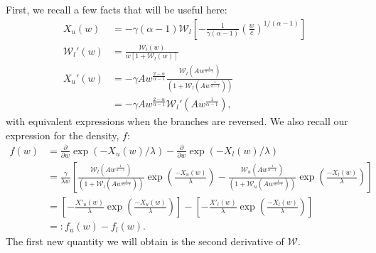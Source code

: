 \documentclass{article}
\newcommand{\sW}{\mathscr{W}}
\begin{document}
First, we recall a few facts that will be useful here:
%
\begin{align}
    X_u(w) &= -\gamma (\alpha - 1) \sW_l\left[ - \frac{1}{\gamma (\alpha - 1)} \left( \frac{w}{c} \right)^{1 / (\alpha - 1)} \right]\\
    \sW_l'(w) &= \frac{\sW_l(w)}{w [1 + \sW_l(w)]} \label{eq:W_prime}\\
    X_u'(w) &= - \gamma A  w^{\frac{2-\alpha}{\alpha-1}} \frac{\sW_l(A w^{ \frac{1}{\alpha-1} })}{ \left( 1 + \sW_l(A w^{ \frac{1}{\alpha-1} }) \right)}\\
    &= - \gamma A  w^{\frac{2-\alpha}{\alpha-1}} \sW_l'(A w^{ \frac{1}{\alpha-1} }), \label{eq:X_u_prime}
\end{align}
%
with equivalent expressions when the branches are reversed. We also recall our expression for the density, $f$:
%
\begin{align}
    f(w) &= \frac{\partial}{\partial w} \exp(-X_u(w)/ \lambda) - \frac{\partial}{\partial w} \exp(-X_l(w)/\lambda) \\
    &= \frac{\gamma}{\lambda w} \left[ \frac{\sW_l(A w^{ \frac{1}{\alpha-1} })}{ \left( 1 + \sW_l(A w^{ \frac{1}{\alpha-1} }) \right)} \exp\left(\frac{-X_{u}(w)}{\lambda}\right) - \frac{\sW_u(A w^{ \frac{1}{\alpha-1} })}{ \left( 1 + \sW_u(A w^{ \frac{1}{\alpha-1} }) \right)}  \exp\left(\frac{-X_{l}(w)}{\lambda}\right) \right]\\
    &= \left[ - \frac{X'_u(w)}{\lambda} \exp\left(\frac{-X_{u}(w)}{\lambda}\right) \right] - \left[- \frac{X'_l(w)}{\lambda} \exp\left(\frac{-X_{l}(w)}{\lambda}\right) \right] \label{eq:wt_dens}\\
    &=: f_u(w) - f_l(w). \label{eq:f_u_f_l}
\end{align}
%
The first new quantity we will obtain is the second derivative of $\sW$.
\end{document}
